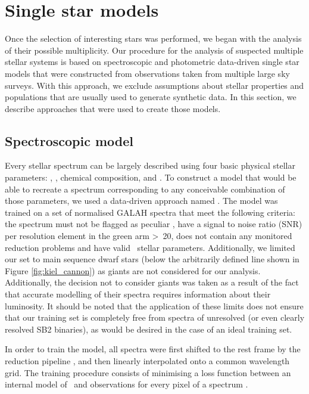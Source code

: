 \section{Single star models}
\label{sec:models_all}
Once the selection of interesting stars was performed, we began with the analysis of their possible multiplicity. Our procedure for the analysis of suspected multiple stellar systems is based on spectroscopic and photometric data-driven single star models that were constructed from observations taken from multiple large sky surveys. With this approach, we exclude assumptions about stellar properties and populations that are usually used to generate synthetic data. In this section, we describe approaches that were used to create those models.

\subsection{Spectroscopic model}
\label{sec:s_model}
Every stellar spectrum can be largely described using four basic physical stellar parameters: \Teff, \Logg, chemical composition, and \vsin. To construct a model that would be able to recreate a spectrum corresponding to any conceivable combination of those parameters, we used a data-driven approach named \TC. The model was trained on a set of normalised GALAH spectra that meet the following criteria: the spectrum must not be flagged as peculiar \cite{2017ApJS..228...24T}, have a signal to noise ratio (SNR) per resolution element in the green arm >~20, does not contain any monitored reduction problems and have valid \TC\ stellar parameters. Additionally, we limited our set to main sequence dwarf stars (below the arbitrarily defined line shown in Figure \ref{fig:kiel_cannon}) as giants are not considered for our analysis. Additionally, the decision not to consider giants was taken as a result of the fact that accurate modelling of their spectra requires information about their luminosity. It should be noted that the application of these limits does not ensure that our training set is completely free from spectra of unresolved (or even clearly resolved SB2 binaries), as would be desired in the case of an ideal training set.

In order to train the model, all spectra were first shifted to the rest frame by the reduction pipeline \cite{2017MNRAS.464.1259K}, and then linearly interpolated onto a common wavelength grid. The training procedure consists of minimising a loss function between an internal model of \TC\ and observations for every pixel of a spectrum \cite{2015ApJ...808...16N}.

